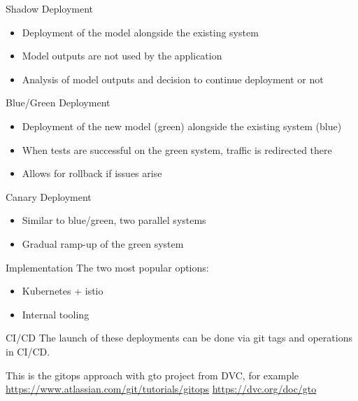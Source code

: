 \begin{frame}{Shadow Deployment}
  \begin{itemize}
    \item Deployment of the model alongside the existing system
    \item Model outputs are not used by the application
    \item Analysis of model outputs and decision to continue deployment or not
  \end{itemize}

  \hugo
\end{frame}


\begin{frame}{Blue/Green Deployment}
  \begin{itemize}
    \item Deployment of the new model (green) alongside the existing system (blue)
    \item When tests are successful on the green system, traffic is redirected there
    \item Allows for rollback if issues arise
  \end{itemize}

  \hugo
\end{frame}


\begin{frame}{Canary Deployment}
  \begin{itemize}
    \item Similar to blue/green, two parallel systems
    \item Gradual ramp-up of the green system
  \end{itemize}

  \hugo
\end{frame}


\begin{frame}{Implementation}
  The two most popular options:
  \begin{itemize}
    \item Kubernetes + istio
    \item Internal tooling
  \end{itemize}

  \hugo
\end{frame}


\begin{frame}{CI/CD}
  The launch of these deployments can be done via git tags and operations in CI/CD.

  This is the gitops approach with gto project from DVC, for example\\[5mm]
  \url{https://www.atlassian.com/git/tutorials/gitops}
  \url{https://dvc.org/doc/gto}

  \hugo
\end{frame}





